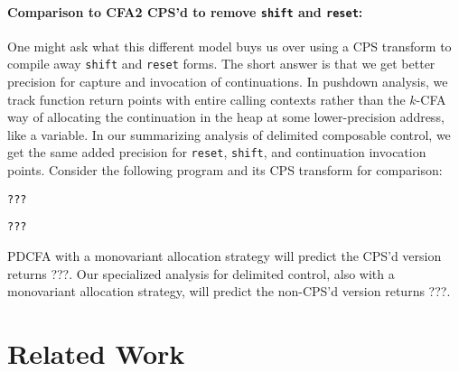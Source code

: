 \paragraph{Comparison to CFA2 CPS'd to remove {\tt shift} and {\tt reset}:}{
  One might ask what this different model buys us over using a CPS transform to compile away {\tt shift} and {\tt reset} forms.
%
The short answer is that we get better precision for capture and invocation of continuations.
%
In pushdown analysis, we track function return points with entire calling contexts rather than the $k$-CFA way of allocating the continuation in the heap at some lower-precision address, like a variable.
%
In our summarizing analysis of delimited composable control, we get the same added precision for {\tt reset}, {\tt shift}, and continuation invocation points.
%
Consider the following program and its CPS transform for comparison:
\begin{lstlisting}
???
\end{lstlisting}

\begin{lstlisting}
???
\end{lstlisting}

PDCFA with a monovariant allocation strategy will predict the CPS'd version returns ???.
%
Our specialized analysis for delimited control, also with a monovariant allocation strategy, will predict the non-CPS'd version returns ???.}

\section{Related Work}


